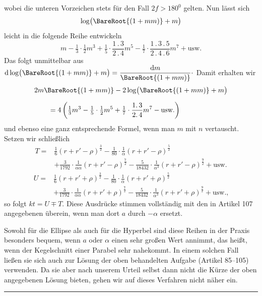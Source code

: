 \noindent wobei die unteren Vorzeichen stets für den Fall $2f>180^0$ gelten. Nun lässt sich
\[
\log\bigl(\BareRoot{(1+mm)}+m\bigr)
\]
\noindent leicht in die folgende Reihe entwickeln
\[
m-\tfrac13\cdot\tfrac12m^3+\tfrac15\cdot\frac{1\mathpunct{.}3}{2\mathpunct{.}4}m^5-\tfrac17\cdot\frac{1\mathpunct{.}3\mathpunct{.}5}{2\mathpunct{.}4\mathpunct{.}6}m^7+\text{usw.}
\]
\noindent Das folgt unmittelbar aus $\mathrm d\log\bigl(\BareRoot{(1+mm)}+m\bigr)=\dfrac{\mathrm dm}{\BareRoot{(1+mm)}}\mathpunct{\cdot}$ Damit erhalten wir
\[
\begin{aligned}
&2m\BareRoot{(1+mm)}-2\log\bigl(\BareRoot{(1+mm)}+m\bigr)\\[.6em]
&\qquad=4\left(\tfrac13m^3-\tfrac15\cdot\tfrac12m^5+\tfrac17\cdot\frac{1\mathpunct{.}3}{2\mathpunct{.}4}m^7-\text{usw.}\right)
\end{aligned}
\]
\noindent{}und ebenso eine ganz entsprechende Formel, wenn man $m$ mit $n$ vertauscht. Setzen wir schließlich
\[
\begin{aligned}
T={}&\tfrac16(r+r'-\rho)^{\frac32}-\tfrac1{80}\cdot\frac1\alpha(r+r'-\rho)^{\frac52}\\[.6em]
&+\tfrac3{1792}\cdot\frac1{\alpha\alpha}(r+r'-\rho)^{\frac72}-\tfrac5{18432}\cdot\frac1{\alpha^3}(r+r'-\rho)^{\frac92}+\text{usw.}
\end{aligned}
\]
\[
\begin{aligned}
U={}&\tfrac16(r+r'+\rho)^{\frac32}-\tfrac1{80}\cdot\frac1\alpha(r+r'+\rho)^{\frac52}\\[.6em]
&+\tfrac3{1792}\cdot\frac1{\alpha\alpha}(r+r'+\rho)^{\frac72}-\tfrac5{18432}\cdot\frac1{\alpha^3}(r+r'+\rho)^{\frac92}+\text{usw.,}
\end{aligned}
\]
\noindent so folgt $kt=U\mp T$. Diese Ausdrücke stimmen vollständig mit den in Artikel 107 angegebenen überein, wenn man dort $a$ durch $-\alpha$ ersetzt.
\par
Sowohl für die Ellipse als auch für die Hyperbel sind diese Reihen in der Praxis besonders bequem, wenn $a$ oder $\alpha$ einen sehr großen Wert annimmt, das heißt, wenn der Kegelschnitt einer Parabel sehr nahekommt. In einem solchen Fall ließen sie sich auch zur Lösung der oben behandelten Aufgabe (Artikel 85--105) verwenden. Da sie aber nach unserem Urteil selbst dann nicht die Kürze der oben angegebenen Lösung bieten, gehen wir auf dieses Verfahren nicht näher ein.
\par\bigskip\begin{center}\rule{.23\linewidth}{.35pt}\end{center}
